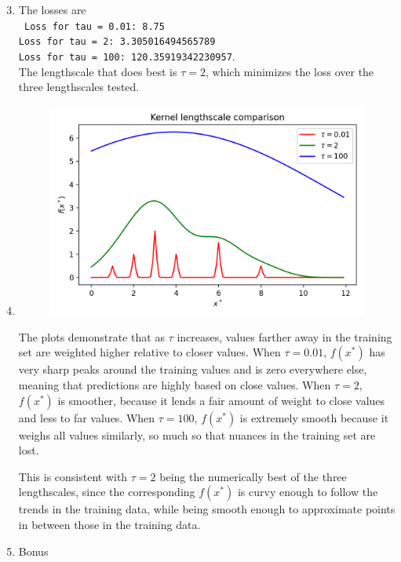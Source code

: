 \documentclass[submit]{harvardml}
\begin{document}
\begin{enumerate}
	\setcounter{enumi}{2}
	\item The losses are \\
	\texttt{
	Loss for tau = 0.01: 8.75 \\
	Loss for tau = 2: 3.305016494565789 \\
	Loss for tau = 100: 120.35919342230957}. \\
	The lengthscale that does best is $\tau = 2$, which minimizes the loss over the three lengthscales tested.

	\item 
	
	\begin{figure}[h]
		\includegraphics{T1_P1_plot}
	\end{figure}

	The plots demonstrate that as $\tau$ increases, values farther away in the training set are weighted higher relative to closer values. When $\tau = 0.01$, $f(x^*)$ has very sharp peaks around the training values and is zero everywhere else, meaning that predictions are highly based on close values. When $\tau = 2$, $f(x^*)$ is smoother, because it lends a fair amount of weight to close values and less to far values. When $\tau = 100$, $f(x^*)$ is extremely smooth because it weighs all values similarly, so much so that nuances in the training set are lost.
	
	This is consistent with $\tau=2$ being the numerically best of the three lengthscales, since the corresponding $f(x^*)$ is curvy enough to follow the trends in the training data, while being smooth enough to approximate points in between those in the training data.

	\item Bonus

\end{enumerate}
\end{document}
